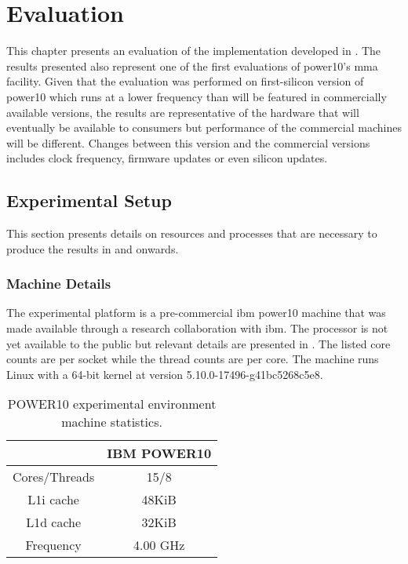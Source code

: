 \documentclass[\main/thesis.tex]{subfiles}
\begin{document}
\chapter{Evaluation}
\label{cha:evaluation}
This chapter presents an evaluation of the implementation developed in .
The results presented also represent one of the first evaluations of \gls{power10}'s \gls{mma} facility.
Given that the evaluation was performed on first-silicon version of \gls{power10} which runs at a lower frequency than will be featured in commercially available versions, the results are representative of the hardware that will eventually be available to consumers but performance of the commercial machines will be different.
Changes between this version and the commercial versions includes clock frequency, firmware updates or even silicon updates.

\section{Experimental Setup}
This section presents details on resources and processes that are necessary to produce the results in  and onwards.

\subsection{Machine Details}
The experimental platform is a pre-commercial \gls{ibm} \gls{power10} machine that was made available through a research collaboration with \gls{ibm}.
The processor is not yet available to the public but relevant details are presented in .
The listed core counts are per socket while the thread counts are per core.
The machine runs Linux with a 64-bit kernel at version 5.10.0-17496-g41bc5268c5e8.

\begin{table}[t]
  \centering
  \begin{tabular}{c | c}
    & IBM POWER10\\\hline
    Cores/Threads & 15/8\\
    L1i cache & 48KiB\\
    L1d cache & 32KiB\\
    Frequency & 4.00 GHz\\
  \end{tabular}
  \caption[POWER10 Machine Statistics]{POWER10 experimental environment machine statistics.}
  \label{tab:machineInfo}
\end{table}
\end{document}
